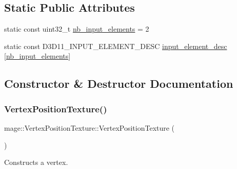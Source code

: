 \subsection*{Static Public Attributes}
\begin{DoxyCompactItemize}
\item 
static const uint32\+\_\+t \hyperlink{structmage_1_1_vertex_position_texture_a1ef796b1dfad7a11d03120cb65a8cdb4}{nb\+\_\+input\+\_\+elements} = 2
\item 
static const D3\+D11\+\_\+\+I\+N\+P\+U\+T\+\_\+\+E\+L\+E\+M\+E\+N\+T\+\_\+\+D\+E\+SC \hyperlink{structmage_1_1_vertex_position_texture_afbe5de758f42c05cdb10c493f90b6fca}{input\+\_\+element\+\_\+desc} \mbox{[}\hyperlink{structmage_1_1_vertex_position_texture_a1ef796b1dfad7a11d03120cb65a8cdb4}{nb\+\_\+input\+\_\+elements}\mbox{]}
\end{DoxyCompactItemize}


\subsection{Constructor \& Destructor Documentation}
\hypertarget{structmage_1_1_vertex_position_texture_ada4dbdc6e21b7408f1bfe69d821a4b48}{}\label{structmage_1_1_vertex_position_texture_ada4dbdc6e21b7408f1bfe69d821a4b48} 
\subsubsection{\texorpdfstring{Vertex\+Position\+Texture()}{VertexPositionTexture()}\hspace{0.1cm}{\footnotesize\ttfamily [1/3]}}
{\footnotesize\ttfamily mage\+::\+Vertex\+Position\+Texture\+::\+Vertex\+Position\+Texture (\begin{DoxyParamCaption}{ }\end{DoxyParamCaption})\hspace{0.3cm}{\ttfamily [default]}}

Constructs a vertex. \hypertarget{structmage_1_1_vertex_position_texture_aa4037156fff314fb2780db6e3acaea50}{}\label{structmage_1_1_vertex_position_texture_aa4037156fff314fb2780db6e3acaea50} 
